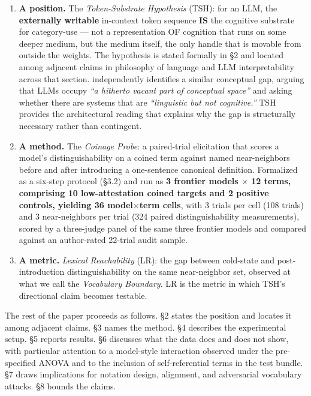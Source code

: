 \documentclass[11pt,a4paper]{article}
\begin{document}
\begin{enumerate}
  \item \textbf{A position.} The \textit{Token-Substrate Hypothesis} (TSH): for an LLM, the \textbf{externally writable} in-context token sequence \textbf{IS} the cognitive substrate for category-use --- not a representation OF cognition that runs on some deeper medium, but the medium itself, the only handle that is movable from outside the weights. The hypothesis is stated formally in \S2 and located among adjacent claims in philosophy of language and LLM interpretability across that section. \citet{nefdt2026linguistic} independently identifies a similar conceptual gap, arguing that LLMs occupy \textit{``a hitherto vacant part of conceptual space''} and asking whether there are systems that are \textit{``linguistic but not cognitive.''} TSH provides the architectural reading that explains why the gap is structurally necessary rather than contingent.
  \item \textbf{A method.} The \textit{Coinage Probe}: a paired-trial elicitation that scores a model's distinguishability on a coined term against named near-neighbors before and after introducing a one-sentence canonical definition. Formalized as a six-step protocol (\S3.2) and run as \textbf{3 frontier models $\times$ 12 terms, comprising 10 low-attestation coined targets and 2 positive controls, yielding 36 model$\times$term cells}, with 3 trials per cell (108 trials) and 3 near-neighbors per trial (324 paired distinguishability measurements), scored by a three-judge panel of the same three frontier models and compared against an author-rated 22-trial audit sample.
  \item \textbf{A metric.} \textit{Lexical Reachability} (LR): the gap between cold-state and post-introduction distinguishability on the same near-neighbor set, observed at what we call the \textit{Vocabulary Boundary}. LR is the metric in which TSH's directional claim becomes testable.
\end{enumerate}

The rest of the paper proceeds as follows. \S2 states the position and locates it among adjacent claims. \S3 names the method. \S4 describes the experimental setup. \S5 reports results. \S6 discusses what the data does and does not show, with particular attention to a model-style interaction observed under the pre-specified ANOVA and to the inclusion of self-referential terms in the test bundle. \S7 draws implications for notation design, alignment, and adversarial vocabulary attacks. \S8 bounds the claims.
\end{document}
